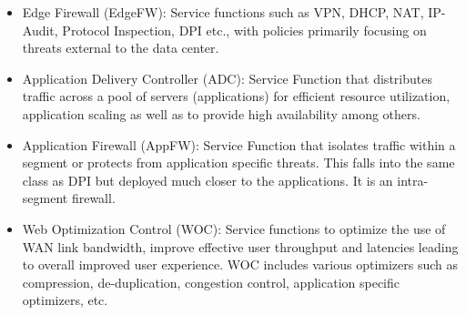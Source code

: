 \begin{itemize}
\item
Edge Firewall (EdgeFW): Service functions such as VPN, DHCP, NAT, IP-Audit, Protocol Inspection, DPI etc., with policies primarily focusing on threats external to the data center.

\item
Application Delivery Controller (ADC): Service Function that distributes traffic across a pool of servers (applications) for efficient resource utilization, application scaling as well as to provide high availability among others.

\item
Application Firewall (AppFW): Service Function that isolates traffic within a segment or protects from application specific threats. This falls into the same class as DPI but deployed much closer to the applications. It is an intra-segment firewall.

\item
Web Optimization Control (WOC): Service functions to optimize the use of WAN link bandwidth, improve effective user throughput and latencies leading to overall improved user experience. WOC includes various optimizers such as compression, de-duplication, congestion control, application specific optimizers, etc. %
\end{itemize}






